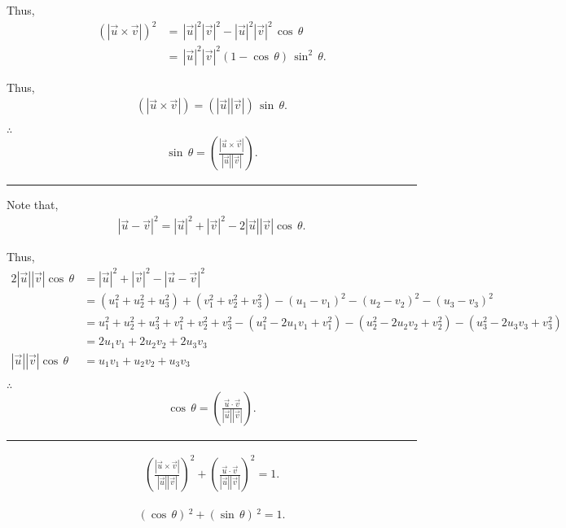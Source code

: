 \documentclass[12pt,a4paper]{article}
\begin{document}
Thus,
\begin{align*}
	(|\vec{u} \times \vec{v}|)^{2}&=\,|\vec{u}|^{2}|\vec{v}|^{2}-|\vec{u}|^{2}|\vec{v}|^{2}\,\cos\,\theta \\
	&=\,|\vec{u}|^{2}|\vec{v}|^{2}(1-\cos\,\theta)\,\sin^{2}\,\theta.
\end{align*}

Thus,
\begin{align*}
(|\vec{u} \times \vec{v}|)=(|\vec{u}||\vec{v}|)\,\sin\,\theta.
\end{align*}

$\therefore$
\begin{align*}
    \sin\,\theta=\left(\frac{|\vec{u} \times \vec{v}|}{|\vec{u}||\vec{v}|}\right).
\end{align*}

\begin{center}
\rule{8cm}{0.4pt}
\end{center}

Note that,
\begin{align*}
    |\vec{u}-\vec{v}|^{2}=|\vec{u}|^{2}+|\vec{v}|^{2}-2|\vec{u}||\vec{v}|\cos\,\theta.
\end{align*}

Thus,
\begin{align*}
    2|\vec{u}||\vec{v}|\cos\,\theta&=|\vec{u}|^{2}+|\vec{v}|^{2}-|\vec{u}-\vec{v}|^{2} \\
    &=(u_1^{2}+u_2^{2}+u_3^{2})+(v_1^{2}+v_2^{2}+v_3^{2})-(u_1-v_1)^{2}-(u_2-v_2)^{2}-(u_3-v_3)^{2} \\
    &=u_1^{2}+u_2^{2}+u_3^{2}+v_1^{2}+v_2^{2}+v_3^{2}-(u_1^{2}-2u_1v_1+v_1^{2})-(u_2^{2}-2u_2v_2+v_2^{2})-(u_3^{2}-2u_3v_3+v_3^{2}) \\
    &=2u_1v_1+2u_2v_2+2u_3v_3 \\
    |\vec{u}||\vec{v}|\cos\,\theta&=u_1v_1+u_2v_2+u_3v_3
\end{align*}

$\therefore$
\begin{align*}
    \cos\,\theta=\left(\frac{\vec{u} \cdot \vec{v}}{|\vec{u}||\vec{v}|}\right).
\end{align*}

\begin{center}
\rule{8cm}{0.4pt}
\end{center}

\begin{ceqn}
    \begin{align*}
        \left(\frac{|\vec{u} \times \vec{v}|}{|\vec{u}||\vec{v}|}\right)^{2}+\left(\frac{\vec{u} \cdot \vec{v}}{|\vec{u}||\vec{v}|}\right)^{2}=1.
    \end{align*}
\end{ceqn}

\begin{ceqn}
    \begin{align*}
        (\cos\,\theta)\,^2+(\sin\,\theta)\,^2=1.
    \end{align*}
\end{ceqn}
\end{document}
